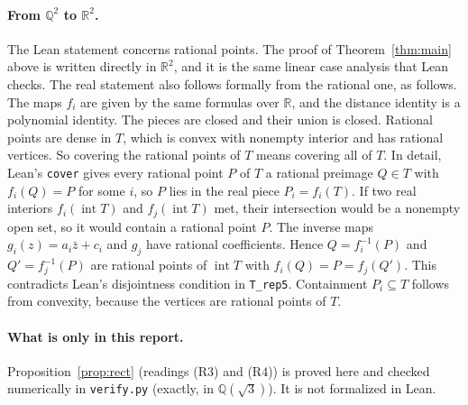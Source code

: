 \documentclass[11pt]{article}
\theoremstyle{definition}
\theoremstyle{remark}
\begin{document}
\paragraph{From $\mathbb Q^2$ to $\mathbb R^2$.} The Lean statement concerns rational
points. The proof of Theorem~\ref{thm:main} above is written directly in $\mathbb R^2$, and
it is the same linear case analysis that Lean checks. The real statement also follows
formally from the rational one, as follows. The maps $f_i$ are given by the same formulas
over $\mathbb R$, and the distance identity is a polynomial identity. The pieces are closed
and their union is closed. Rational points are dense in $T$, which is convex with nonempty
interior and has rational vertices. So covering the rational points of $T$ means covering
all of $T$. In detail, Lean's \texttt{cover} gives every rational point $P$ of $T$ a
rational preimage $Q\in T$ with $f_i(Q)=P$ for some $i$, so $P$ lies in the real piece
$P_i=f_i(T)$. If two real interiors $f_i(\operatorname{int}T)$ and
$f_j(\operatorname{int}T)$ met, their intersection would be a nonempty open set, so it would
contain a rational point $P$. The inverse maps $g_i(z)=a_i\bar z+c_i$ and $g_j$ have rational
coefficients. Hence $Q=f_i^{-1}(P)$ and $Q'=f_j^{-1}(P)$ are rational points of
$\operatorname{int}T$ with $f_i(Q)=P=f_j(Q')$. This contradicts Lean's disjointness
condition in \texttt{T\_rep5}. Containment
$P_i\subseteq T$ follows from convexity, because the vertices are rational points of $T$.

\paragraph{What is only in this report.} Proposition~\ref{prop:rect} (readings (R3) and
(R4)) is proved here and checked numerically in \texttt{verify.py} (exactly, in
$\mathbb Q(\sqrt3)$). It is not formalized in Lean.
\end{document}
